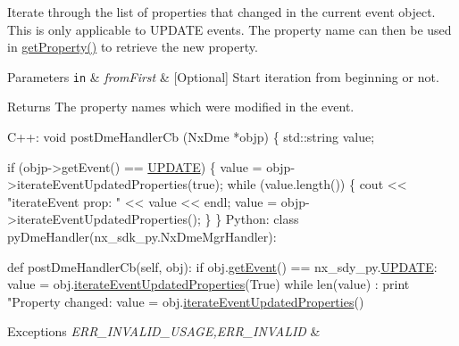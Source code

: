 Iterate through the list of properties that changed in the current event object. This is only applicable to U\+P\+D\+A\+TE events. The property name can then be used in \mbox{\hyperlink{classnxos_1_1_nx_dme_af4a2a0bb41b6be55593e8624700a2d6d}{get\+Property()}} to retrieve the new property.


\begin{DoxyParams}[1]{Parameters}
\mbox{\tt in}  & {\em from\+First} & \mbox{[}Optional\mbox{]} Start iteration from beginning or not. \\
\hline
\end{DoxyParams}
\begin{DoxyReturn}{Returns}
The property names which were modified in the event. 
\begin{DoxyCode}
C++:
     \textcolor{keywordtype}{void} postDmeHandlerCb (NxDme *objp)
     \{
        std::string value;

        \textcolor{keywordflow}{if} (objp->getEvent() == \mbox{\hyperlink{namespacenxos_af9a9040b7681199d386e94eb888018cba4f3a5ababd9a5356d642a492f5ccc371}{UPDATE}}) \{
          value = objp->iterateEventUpdatedProperties(\textcolor{keyword}{true});
          \textcolor{keywordflow}{while} (value.length()) \{
            cout << \textcolor{stringliteral}{"iterateEvent prop: "} << value << endl;
            value = objp->iterateEventUpdatedProperties();
          \}
        \}
Python:
      \textcolor{keyword}{class }pyDmeHandler(nx\_sdk\_py.NxDmeMgrHandler):

        def postDmeHandlerCb(self, obj):
           if obj.\mbox{\hyperlink{classnxos_1_1_nx_dme_aff302a3891e0b6f69e9e0fd26e6e16a7}{getEvent}}() == nx\_sdy\_py.\mbox{\hyperlink{namespacenxos_af9a9040b7681199d386e94eb888018cba4f3a5ababd9a5356d642a492f5ccc371}{UPDATE}}:
               value = obj.\mbox{\hyperlink{classnxos_1_1_nx_dme_a2fe8b05c2c14f16ad7a2f4002a63baf2}{iterateEventUpdatedProperties}}(True)
               while len(value) :
                  print "Property changed: %
                  value = obj.\mbox{\hyperlink{classnxos_1_1_nx_dme_a2fe8b05c2c14f16ad7a2f4002a63baf2}{iterateEventUpdatedProperties}}()
\end{DoxyCode}

\end{DoxyReturn}

\begin{DoxyExceptions}{Exceptions}
{\em E\+R\+R\+\_\+\+I\+N\+V\+A\+L\+I\+D\+\_\+\+U\+S\+A\+GE,E\+R\+R\+\_\+\+I\+N\+V\+A\+L\+ID} & \\
\hline
\end{DoxyExceptions}
\mbox{\label{classnxos_1_1_nx_dme_abb7ee373c1fe3a50b52a243be2f9a863}} 
